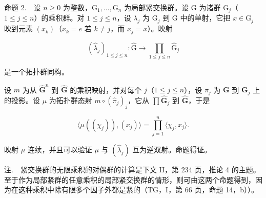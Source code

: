 命题 2.　设 \(n \geqslant 0\) 为整数，\(\mathrm{G}_{1}, \ldots, \mathrm{G}_{n}\) 为局部紧交换群。设 G 为诸群 \(\mathrm{G}_{j}\)（\(1 \leqslant j \leqslant n\)）的乘积群。对 \(1 \leqslant j \leqslant n\)，设 \(\lambda_{j}\) 为 \(\mathrm{G}_{j}\) 到 G 中的单射，它把 \(x \in \mathrm{G}_{j}\) 映到元素 \((x_{k})\)（\(x_{k} = e\) 若 \(k \neq j\)，而 \(x_{j} = x\)）。映射

\[
(\widehat {\lambda} _ {j}) _ {1 \leqslant j \leqslant n} \colon \widehat {\mathrm{G}} \to \prod_ {1 \leqslant j \leqslant n} \widehat {\mathrm{G}} _ {j}
\]

是一个拓扑群同构。

设 \(m\) 为从 \(\widehat{\mathbf{G}}^n\) 到 \(\widehat{\mathbf{G}}\) 的乘积映射，并对每个 \(j\)（\(1 \leqslant j \leqslant n\)），设 \(\pi_j\) 为 \(\mathbf{G}\) 到 \(\mathbf{G}_j\) 上的投影。设 \(\mu\) 为拓扑群态射 \(m \circ (\widehat{\pi}_j)_j\)，它从 \(\prod \widehat{\mathbf{G}}_j\) 到 \(\widehat{\mathbf{G}}\)，于是

\[
\langle \mu ((\chi_ {j})), (x _ {j}) \rangle = \prod_ {j = 1} ^ {n} \langle \chi_ {j}, x _ {j} \rangle .
\]

映射 \(\mu\) 连续，并且可以验证 \(\mu\) 与 \((\widehat{\lambda}_j)\) 互为逆双射。命题得证。

注.　紧交换群的无限乘积的对偶群的计算是下文 II，第 234 页，推论 4 的主题。至于作为局部紧群的任意乘积的局部紧交换群的情形，则可由这两个命题得到，因为在这种乘积中除有限多个因子外都是紧的（TG，I，第 66 页，命题 14，b））。


